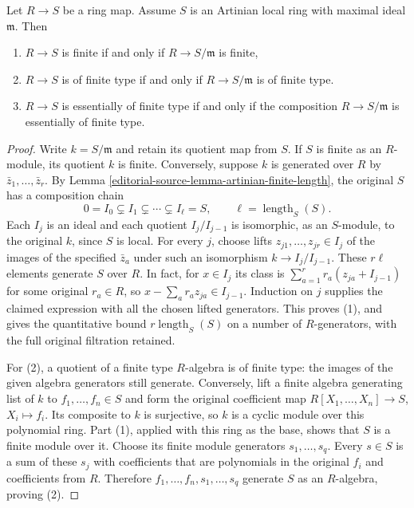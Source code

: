 \begin{lemma}
\label{editorial-source-lemma-essentially-of-finite-type-into-artinian-local}
Let $R \to S$ be a ring map. Assume $S$ is an Artinian local ring with
maximal ideal $\mathfrak m$. Then
\begin{enumerate}
\item $R \to S$ is finite if and only if $R \to S/\mathfrak m$ is finite,
\item $R \to S$ is of finite type if and only if $R \to S/\mathfrak m$
is of finite type.
\item $R \to S$ is essentially of finite type if and
only if the composition $R \to S/\mathfrak m$ is essentially
of finite type.
\end{enumerate}
\end{lemma}

\begin{proof}
Write $k=S/\mathfrak m$ and retain its quotient map from $S$.
If $S$ is finite as an $R$-module, its quotient $k$ is finite.
Conversely, suppose $k$ is generated over $R$ by
$\bar z_1,\ldots,\bar z_r$. By
Lemma \ref{editorial-source-lemma-artinian-finite-length}, the original $S$
has a composition chain
$$
0=I_0\subsetneq I_1\subsetneq\cdots\subsetneq I_\ell=S,
\qquad \ell=\operatorname{length}_S(S).
$$
Each $I_j$ is an ideal and each quotient $I_j/I_{j-1}$ is
isomorphic, as an $S$-module, to the original $k$, since $S$
is local. For every $j$, choose lifts $z_{j1},\ldots,z_{jr}\in I_j$
of the images of the specified $\bar z_a$ under such an
isomorphism $k\to I_j/I_{j-1}$.
These $r\ell$ elements generate $S$ over $R$.
In fact, for $x\in I_j$ its class is
$\sum_{a=1}^r r_a(z_{ja}+I_{j-1})$ for some original
$r_a\in R$, so $x-\sum_a r_a z_{ja}\in I_{j-1}$.
Induction on $j$ supplies the claimed expression with all the
chosen lifted generators. This proves (1), and gives the
quantitative bound $r\operatorname{length}_S(S)$ on a number
of $R$-generators, with the full original filtration retained.

For (2), a quotient of a finite type $R$-algebra is of finite
type: the images of the given algebra generators still generate.
Conversely, lift a finite algebra generating list of $k$ to
$f_1,\ldots,f_n\in S$ and form the original coefficient map
$R[X_1,\ldots,X_n]\to S$, $X_i\mapsto f_i$.
Its composite to $k$ is surjective, so $k$ is a cyclic module
over this polynomial ring. Part (1), applied with this ring as
the base, shows that $S$ is a finite module over it.
Choose its finite module generators $s_1,\ldots,s_q$.
Every $s\in S$ is a sum of these $s_j$ with coefficients
that are polynomials in the original $f_i$ and coefficients
from $R$. Therefore $f_1,\ldots,f_n,s_1,\ldots,s_q$ generate
$S$ as an $R$-algebra, proving (2).


\end{proof}
